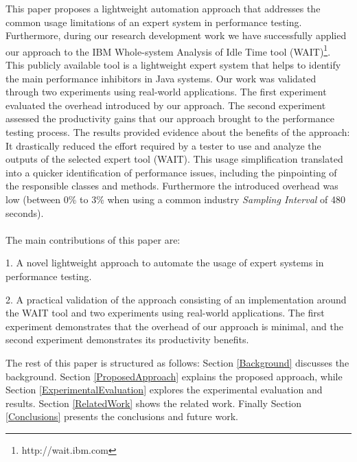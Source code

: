 \documentclass[runningheads,a4paper]{llncs}
\newcommand{\myspaceM}{-7.6pt}
\begin{document}
This paper proposes a lightweight automation approach that addresses the common
usage limitations of an expert system in performance testing. Furthermore,
during our research development work we have successfully applied our approach
to the IBM Whole-system Analysis of Idle Time tool (WAIT)\footnote{http://wait.ibm.com}.
This publicly available tool is a lightweight expert system that helps to
identify the main performance inhibitors %
in Java systems. Our work
was validated through two experiments using real-world applications. The first
experiment evaluated the overhead introduced by our approach. The second
experiment assessed the productivity gains that our approach brought to the
performance testing process. The results provided evidence about the benefits 
of the approach: It drastically reduced the effort required by a tester to use 
and analyze the outputs of the selected expert tool (WAIT). This usage simplification 
translated into a quicker identification of performance issues, including the pinpointing 
of the responsible classes and methods. Furthermore the introduced overhead was
low (between 0\% to 3\% when using a common industry \emph{Sampling Interval} of 480 seconds).
\\\\
The main contributions of this paper are: 

1. A novel lightweight approach to automate the usage of expert systems in
performance testing.

2. A practical validation of the approach consisting of an implementation
around the WAIT tool and two experiments using real-world applications. The
first experiment demonstrates that the overhead of our approach is minimal, and the
second experiment demonstrates its productivity benefits.

The rest of this paper is structured as follows: Section \ref{Background}
discusses the background. Section \ref{ProposedApproach} explains the proposed
approach, while Section \ref{ExperimentalEvaluation} explores the experimental 
evaluation and results. Section \ref{RelatedWork} shows the related work.
Finally Section \ref{Conclusions} presents the conclusions and future work.


\vspace{\myspaceM{}}
\end{document}

